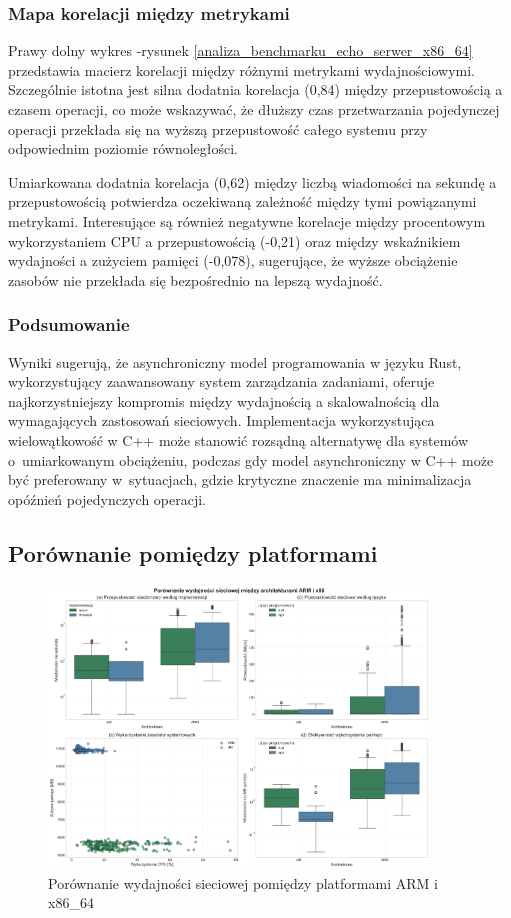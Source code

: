\subsubsection{Mapa korelacji między metrykami}
Prawy dolny wykres -rysunek \ref{analiza_benchmarku_echo_serwer_x86_64} przedstawia macierz korelacji między różnymi metrykami wydajnościowymi. Szczególnie istotna jest silna dodatnia korelacja (0,84) między przepustowością a czasem operacji, co może wskazywać, że dłuższy czas przetwarzania pojedynczej operacji przekłada się na wyższą przepustowość całego systemu przy odpowiednim poziomie równoległości.

Umiarkowana dodatnia korelacja (0,62) między liczbą wiadomości na sekundę a przepustowością potwierdza oczekiwaną zależność między tymi powiązanymi metrykami. Interesujące są również negatywne korelacje między procentowym wykorzystaniem CPU a przepustowością \mbox{(-0,21)} oraz między wskaźnikiem wydajności a zużyciem pamięci (-0,078), sugerujące, że wyższe obciążenie zasobów nie przekłada się bezpośrednio na lepszą wydajność.

\subsubsection{Podsumowanie}
Wyniki sugerują, że asynchroniczny model programowania w języku Rust, wykorzystujący zaawansowany system zarządzania zadaniami, oferuje najkorzystniejszy kompromis między wydajnością a skalowalnością dla wymagających zastosowań sieciowych. Implementacja wykorzystująca wielowątkowość w C++ może stanowić rozsądną alternatywę dla systemów o~umiarkowanym obciążeniu, podczas gdy model asynchroniczny w C++ może być preferowany w~sytuacjach, gdzie krytyczne znaczenie ma minimalizacja opóźnień pojedynczych operacji.

\subsection{Porównanie pomiędzy platformami}
\begin{figure}[H]
    \centering
    \includegraphics[width=0.9\textwidth]{analiza/images/conc/echo/compare/rysunek_1_wydajnosc_sieciowa.png}
    \caption{Porównanie wydajności sieciowej pomiędzy platformami ARM i x86\_64}
    \label{rysunek_1_wydajnosc_sieciowa}
\end{figure}
